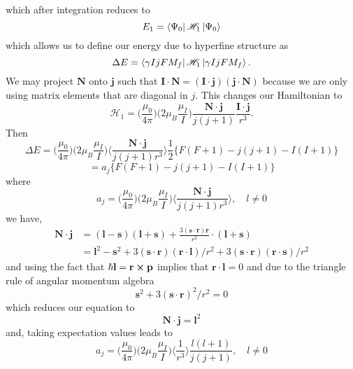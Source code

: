 which after integration reduces to
\begin{equation}
  E_1=\bra{\Psi_0} \mathscr{H}_1 \ket{\Psi_0}
\end{equation}
which allows us to define our energy due to hyperfine structure as 
\begin{equation}
    \Delta E =\bra{\gamma IjFM_f}\mathscr{H}_1\ket{\gamma IjFM_f}.
\end{equation}
We may project $\mathbf{N}$ onto $\mathbf{j}$ such that $\mathbf{I}\cdot\mathbf{N}= (\mathbf{I}\cdot \mathbf{j})(\mathbf{j}\cdot \mathbf{N})$ because we are only using matrix elements that are diagonal in $j$. This changes our Hamiltonian to
\begin{equation}
    \mathscr{H}_1= \bigg(\frac{\mu_0}{4\pi}\bigg)\bigg(2\mu_B \frac{\mu_I}{I}\bigg)
    \frac{\mathbf{N} \cdot \mathbf{j}}{j(j+1)}\frac{\mathbf{I}\cdot\mathbf{j}}{r^3}.
\end{equation}
Then
\begin{equation}
    \Delta E =\bigg(\frac{\mu_0}{4\pi}\bigg)\bigg(2\mu_B \frac{\mu_I}{I}\bigg)
    \bigg \langle \frac{\mathbf{N} \cdot \mathbf{j}}{j(j+1)r^3}\bigg \rangle
    \frac{1}{2} \{F(F+1)-j(j+1)-I(I+1)\}
\end{equation}
\begin{equation}
    =a_j\{F(F+1)-j(j+1)-I(I+1)\}
\end{equation}
where
\begin{equation}
    a_j=\bigg(\frac{\mu_0}{4\pi}\bigg)\bigg(2\mu_B \frac{\mu_I}{I}\bigg)
    \bigg \langle \frac{\mathbf{N} \cdot \mathbf{j}}{j(j+1)r^3}\bigg \rangle
    ,\quad l\neq 0
\end{equation}
we have,
\begin{equation}
    \begin{split}
    \mathbf{N} \cdot \mathbf{j}&=
    (\mathbf{l}-\mathbf{s})(\mathbf{l}+\mathbf{s})+\frac{3( \mathbf{s}\cdot \mathbf{r} )\mathbf{r}}{r^2}
    \cdot (\mathbf{l}+ \mathbf{s})\\
    &= \mathbf{l}^2 -\mathbf{s}^2 +3(\mathbf{s} \cdot \mathbf{r})
    (\mathbf{r}\cdot \mathbf{l})/r^2 +3(\mathbf{s} \cdot \mathbf{r})
    (\mathbf{r}\cdot \mathbf{s})/r^2
    \end{split}
\end{equation}
and using the fact that \(\hbar \mathbf{l}=\mathbf{r}\cross \mathbf{p}\) implies that \(\mathbf{r}\cdot\mathbf{l}=0\) and due to the triangle rule of angular momentum algebra
\begin{equation}
    \mathbf{s}^2 +3(\mathbf{s} \cdot \mathbf{r})^2/r^2=0
\end{equation}
 which reduces our equation to 
\begin{equation}
    \mathbf{N}\cdot \mathbf{j} = \mathbf{l}^2
\end{equation}
and, taking expectation values leads to
\begin{equation}
    a_j=\bigg(\frac{\mu_0}{4\pi}\bigg)\bigg(2\mu_B \frac{\mu_I}{I}\bigg)
    \bigg \langle \frac{1}{r^3}\bigg \rangle
    \frac{l(l+1)}{j(j+1)}
    ,\quad l\neq 0
\end{equation}

